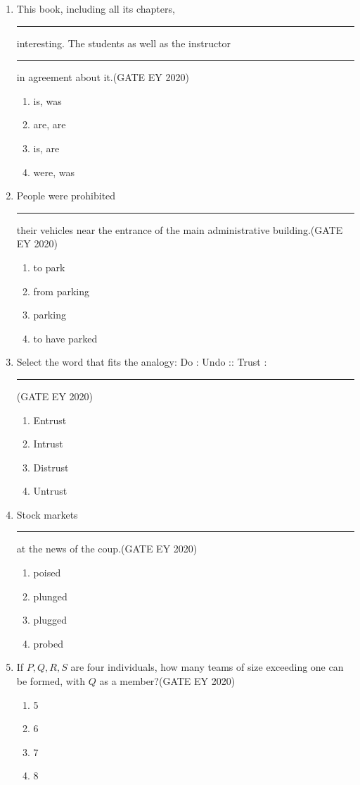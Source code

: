 \begin{enumerate}
\item This book, including all its chapters, \rule{1.5cm}{0.15mm} interesting. The students as well as the instructor \rule{1.5cm}{0.15mm} in agreement about it.\hfill {(GATE EY 2020)}
    \begin{enumerate}
    \item is, was
    \item are, are
    \item is, are
    \item were, was
    \end{enumerate}

\item People were prohibited \rule{1.5cm}{0.15mm} their vehicles near the entrance of the main administrative building.\hfill {(GATE EY 2020)}
    \begin{enumerate}
    \item to park
    \item from parking
    \item parking
    \item to have parked
    \end{enumerate}

\item Select the word that fits the analogy:\newline
Do : Undo :: Trust : \rule{1.5cm}{0.15mm}\hfill {(GATE EY 2020)}
    \begin{enumerate}
    \item Entrust
    \item Intrust
    \item Distrust
    \item Untrust
    \end{enumerate}

\item Stock markets \rule{1.5cm}{0.15mm} at the news of the coup.\hfill {(GATE EY 2020)}
    \begin{enumerate}
    \item poised
    \item plunged
    \item plugged
    \item probed
    \end{enumerate}

\item If $P, Q, R, S$ are four individuals, how many teams of size exceeding one can be formed, with $Q$ as a member?\hfill {(GATE EY 2020)}
    \begin{enumerate}
    \item 5
    \item 6
    \item 7
    \item 8
    \end{enumerate}


\end{enumerate}
